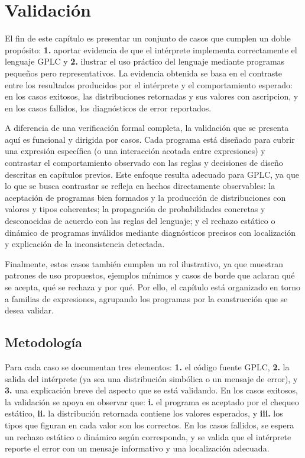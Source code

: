 
\newpage
\section{Validación}



El fin de este capítulo es presentar un conjunto de casos que cumplen
un doble propósito: \textbf{1.} aportar evidencia de que el intérprete
implementa correctamente el lenguaje GPLC y \textbf{2.}  ilustrar el
uso práctico del lenguaje mediante programas pequeños pero
representativos.  La evidencia obtenida se basa en el contraste entre
los resultados producidos por el intérprete y el comportamiento
esperado: en los casos exitosos, las distribuciones retornadas y sus
valores con ascripcion, y en los casos fallidos, los diagnósticos de
error reportados.

A diferencia de una verificación formal completa, la validación que se
presenta aquí es funcional y dirigida por casos.  Cada programa está
diseñado para cubrir una expresión específica (o una interacción
acotada entre expresiones) y contrastar el comportamiento observado
con las reglas y decisiones de diseño descritas en capítulos previos.
Este enfoque resulta adecuado para GPLC, ya que lo que se busca
contrastar se refleja en hechos directamente observables: la
aceptación de programas bien formados y la producción de
distribuciones con valores y tipos coherentes; la propagación de
probabilidades concretas y desconocidas de acuerdo con las reglas del
lenguaje; y el rechazo estático o dinámico de programas inválidos
mediante diagnósticos precisos con localización y explicación de la
inconsistencia detectada.

  Finalmente, estos casos también cumplen un rol ilustrativo, ya que muestran
  patrones de uso propuestos, ejemplos mínimos y casos de borde que
  aclaran qué se acepta, qué se rechaza y por qué. Por ello, el
  capítulo está organizado en torno a familias
  de expresiones, agrupando los programas por la construcción que se desea validar.


\subsection{Metodología}

Para cada caso se documentan tres elementos: \textbf{1.} el código
fuente GPLC, \textbf{2.} la salida del intérprete (ya sea una
distribución simbólica o un mensaje de error), y \textbf{3.} una
explicación breve del aspecto que se está validando. En los casos
exitosos, la validación se apoya en observar que: \textbf{i.} el
programa es aceptado por el chequeo estático, \textbf{ii.} la
distribución retornada contiene los valores esperados, y \textbf{iii.}
los tipos que figuran en cada valor son los correctos. En los casos
fallidos, se espera un rechazo estático o dinámico según corresponda,
y se valida que el intérprete reporte el error con un mensaje
informativo y una localización adecuada.

